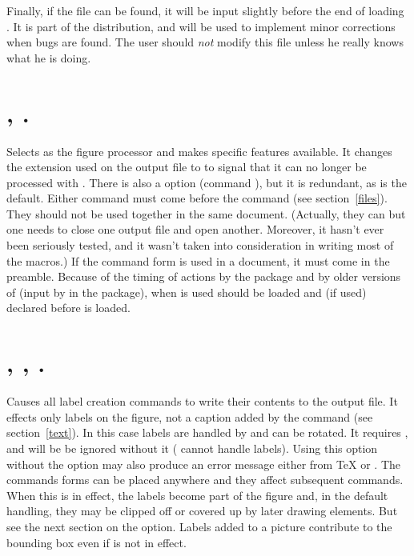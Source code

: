 \documentclass[letterpaper]{article}
\begin{document}
Finally, if the file  can be found, it will be input
slightly before the end of loading \mfp{}. It is part of the \mfp{}
distribution, and will be used to implement minor corrections when bugs
are found. The user should \emph{not} modify this file unless
he really knows what he is doing.

\section{, .}\label{metapost}
%

Selects \MP{} as the figure processor and makes specific features
available. It changes the extension used on the output file to
 to signal that it can no longer be processed with \MF{}. There
is also a  option (command ), but it is
redundant, as \MF{} is the default. Either command must come before the
 command (see section~\ref{files}). They should not
be used together in the same document. (Actually, they can but one needs
to close one output file and open another. Moreover, it hasn't ever been
seriously tested, and it wasn't taken into consideration in writing most
of the macros.) If the command form  is used in a
\LaTeXe{} document, it must come in the preamble. Because of the timing
of actions by the  package and by older versions of
 (input by  in the 
package), when \pdfLaTeX{} is used \mfp{} should be loaded and
 (if used) declared before  is loaded.


\section{, ,
.}\label{mplabels}
%
%

Causes all label creation commands to write their contents to the output
file. It effects only labels on the figure, not a caption added by the
 command (see section~\ref{text}).  In this case labels are
handled by \MP{} and can be rotated. It requires \MP{}, and will be be
ignored without it (\MF{} cannot handle labels). Using this option
without the  option may also produce an error message
either from \TeX{} or \MF{}. The commands forms can be placed anywhere
and they affect subsequent  commands. When this is in effect,
the labels become part of the figure and, in the default handling, they
may be clipped off or covered up by later drawing elements. But see the
next section on the  option. Labels added to a
picture contribute to the bounding box even if  is not in
effect.
\end{document}
